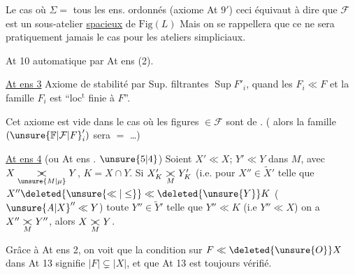 
Le cas où $\Sigma=$ tous les ens. ordonnés (axiome At $9'$) ceci équivaut à dire que $\mathcal F$ est un sous-atelier \uline{spacieux} de  $\mathrm{Fig}(L)$ Mais  on se rappellera que ce ne sera pratiquement jamais le cas pour les ateliers  simpliciaux.

At 10 automatique par At ens (2).

\uline{At ens 3} Axiome de stabilité par Sup. filtrantes $\operatorname{Sup} F'_i$, quand les $F_i\ll F$ et la famille $F_i$ est ``loc$^{\mathrm t}$ finie  à $F$''.

Cet axiome est vide dans le cas où les figures $\in\mathcal F$ sont  de . ( alors la famille $({\unsure{\mathbb F|\mathcal F|F}}'_i)$ sera  $=$  \ldots)


\uline{At ens 4} (ou At ens . $\unsure{5|4}$) Soient  $X'\ll X$; $Y'\ll Y$ dans $M$,  avec $X\mathrel{\underset{\unsure{M|\mu}}{\mathord{\rlap{$>$}<}}}Y$, $K=X\cap Y$. Si $X'_{K}\mathrel{\underset{M}{\mathord{\rlap{$>$}<}}}Y'_{K}$ (i.e. pour   $X''\in\widetilde X'$ telle que $X''\deleted{\unsure{\ll|\leq}}\ll\deleted{\unsure{Y}}K$ ( $ {\unsure{A|X}}''\ll Y$) toute $Y''\in\widetilde Y'$ telle que $Y''\ll K$ (i.e $Y''\ll X$) on a $X''\mathrel{\underset{M}{\mathord{\rlap{$>$}<}}}Y''$, alors $X\mathrel{\underset{M}{\mathord{\rlap{$>$}<}}}Y$.

Grâce à At ens 2, on voit que  la condition sur $F\ll\deleted{\unsure{O}}X$ dans At 13 signifie  $|F|\subsetneq|X|$, et  que At 13 est toujours vérifié.
